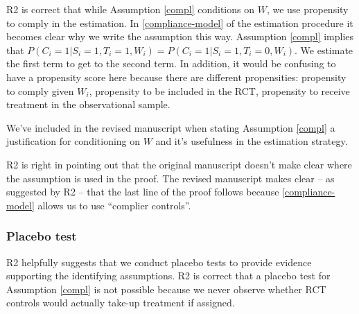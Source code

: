 \documentclass[hidelinks,12pt,letterpaper]{article}
\begin{document}

R2 is correct that while Assumption \ref{compl} conditions on $W$, we use propensity to comply in the estimation.  In \ref{compliance-model} of the estimation procedure it becomes clear why we write the assumption this way. Assumption \ref{compl} implies that $P(C_i=1 | S_i=1, T_i=1, W_i) = P(C_i=1 | S_i=1, T_i=0, W_i)$. We estimate the first term to get to the second term. In addition, it would be confusing to have a propensity score here because there are different propensities: propensity to comply given $W_i$, propensity to be included in the RCT, propensity to receive treatment in the observational sample. 

We've included in the revised manuscript when stating Assumption \ref{compl} a justification for conditioning on $W$ and it's usefulness in the estimation strategy.

R2 is right in pointing out that the original manuscript doesn't make clear where the assumption is used in the proof. The revised manuscript makes clear -- as suggested by R2 -- that the last line of the proof follows because \ref{compliance-model} allows us to use ``complier controls''. 

\subsubsection{Placebo test}

R2 helpfully suggests that we conduct placebo tests to provide evidence supporting the identifying assumptions. R2 is correct that a placebo test for Assumption \ref{compl} is not possible because we never observe whether RCT controls would actually take-up treatment if assigned.
\end{document}
